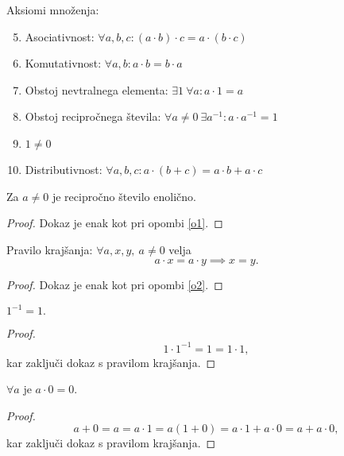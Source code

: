 \documentclass[12pt, a4paper]{article}
\begin{document}
\begin{okvir}
\begin{definicija}
Aksiomi množenja:

\begin{enumerate}[label=A\arabic*.]
\setcounter{enumi}{4}
\item Asociativnost: $\forall a, b, c\colon(a\cdot b)\cdot c=a\cdot(b\cdot c)$
\item Komutativnost: $\forall a, b\colon a\cdot b=b\cdot a$
\item Obstoj nevtralnega elementa: $\exists 1~\forall a\colon a\cdot 1=a$
\item Obstoj recipročnega števila: $\forall a\ne 0~\exists a^{-1}\colon a\cdot a^{-1}=1$
\item $1\ne 0$
\item Distributivnost: $\forall a,b,c\colon a\cdot(b+c)=a\cdot b+a\cdot c$
\end{enumerate}
\end{definicija}
\end{okvir}

\begin{opomba}
Za $a\ne 0$ je recipročno število enolično.
\end{opomba}

\begin{proof}
Dokaz je enak kot pri opombi \ref{o1}.
\end{proof}

\begin{opomba}
Pravilo krajšanja: $\forall a,x,y,~a\ne 0$ velja
\[
a\cdot x=a\cdot y\implies x=y.
\]
\end{opomba}

\begin{proof}
Dokaz je enak kot pri opombi \ref{o2}.
\end{proof}

\begin{posledica}
$1^{-1}=1.$
\end{posledica}

\begin{proof}
\[
1\cdot 1^{-1}=1=1\cdot 1,
\]
kar zaključi dokaz s pravilom krajšanja.
\end{proof}

\begin{posledica}
$\forall a$ je $a\cdot 0=0$.
\end{posledica}

\begin{proof}
\[
a+0=a=a\cdot 1=a(1+0)=a\cdot 1+a\cdot 0=a+a\cdot 0,
\]
kar zaključi dokaz s pravilom krajšanja.
\end{proof}
\end{document}
